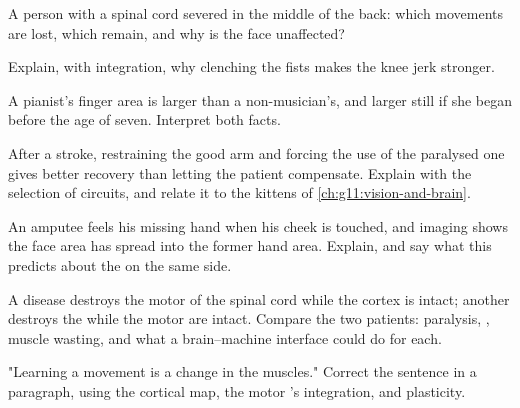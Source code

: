\begin{exercise}[$\star\star$]\label{exo:g12:brain-and-movement:9}
A person with a spinal cord severed in the middle of the back: which
movements are lost, which  remain, and why is the face
unaffected?
\end{exercise}

\begin{exercise}[$\star\star$]\label{exo:g12:brain-and-movement:10}
Explain, with integration, why clenching the fists makes the knee
jerk stronger.
\end{exercise}

\begin{exercise}[$\star\star$]\label{exo:g12:brain-and-movement:11}
A pianist's finger area is larger than a non-musician's, and larger
still if she began before the age of seven. Interpret both facts.
\end{exercise}

\begin{exercise}[$\star\star\star$]\label{exo:g12:brain-and-movement:12}
After a stroke, restraining the good arm and forcing the use of the
paralysed one gives better recovery than letting the patient
compensate. Explain with the selection of circuits, and relate it to
the kittens of \cref{ch:g11:vision-and-brain}.
\end{exercise}

\begin{exercise}[$\star\star\star$]\label{exo:g12:brain-and-movement:13}
An amputee feels his missing hand when his cheek is touched, and
imaging shows the face area has spread into the former hand area.
Explain, and say what this predicts about the  on the
same side.
\end{exercise}

\begin{exercise}[$\star\star\star$]\label{exo:g12:brain-and-movement:14}
A disease destroys the motor  of the spinal cord while the
cortex is intact; another destroys the  while the motor
 are intact. Compare the two patients: paralysis, ,
muscle wasting, and what a brain--machine interface could do for each.
\end{exercise}

\begin{exercise}[$\star\star\star$]\label{exo:g12:brain-and-movement:15}
"Learning a movement is a change in the muscles." Correct the
sentence in a paragraph, using the cortical map, the motor 's
integration, and plasticity.
\end{exercise}

